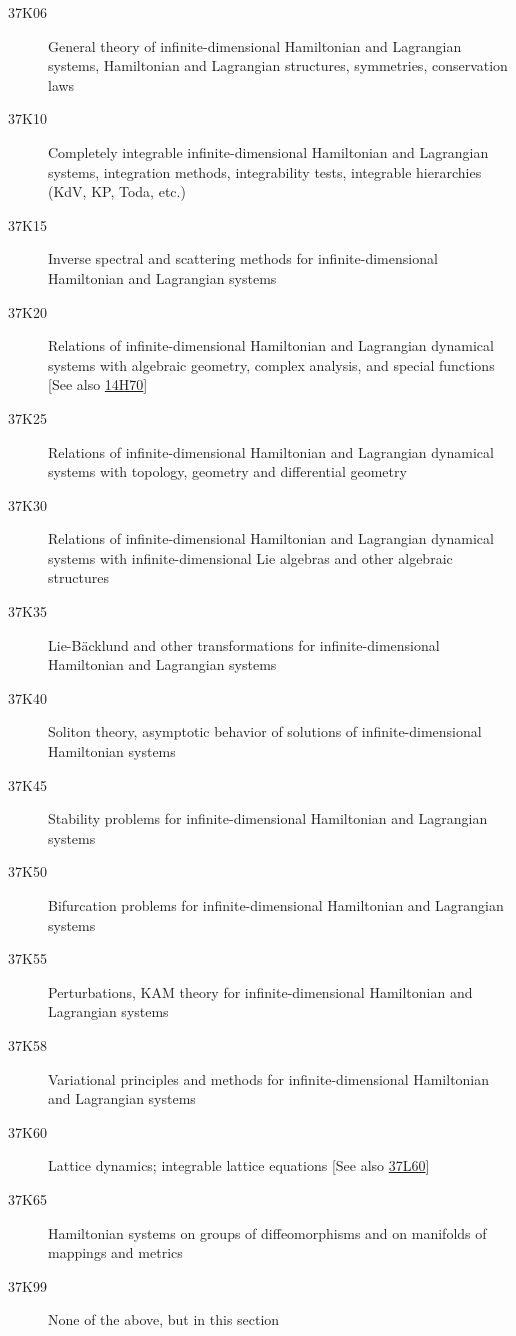 \begin{description} 
\item [37K06]\label{37K06} General theory of infinite-dimensional Hamiltonian and Lagrangian systems, Hamiltonian and Lagrangian structures, symmetries,  conservation laws
\item [37K10]\label{37K10} Completely integrable infinite-dimensional Hamiltonian and Lagrangian systems, integration methods, integrability tests, integrable hierarchies (KdV, KP, Toda, etc.)
\item [37K15]\label{37K15} Inverse spectral and scattering methods for infinite-dimensional Hamiltonian and Lagrangian systems
\item [37K20]\label{37K20}  Relations of infinite-dimensional Hamiltonian and Lagrangian dynamical systems with algebraic geometry, complex analysis, and special functions [See also \hyperref[14H70]{14H70}]
\item [37K25]\label{37K25} Relations of infinite-dimensional Hamiltonian and Lagrangian dynamical systems with topology, geometry and differential geometry
\item [37K30]\label{37K30} Relations of infinite-dimensional Hamiltonian and Lagrangian dynamical systems with infinite-dimensional Lie algebras and other algebraic structures
\item [37K35]\label{37K35} Lie-B\"{a}cklund and other transformations for infinite-dimensional Hamiltonian and Lagrangian systems
\item [37K40]\label{37K40} Soliton theory, asymptotic behavior of solutions of infinite-dimensional Hamiltonian systems
\item [37K45]\label{37K45} Stability problems for infinite-dimensional Hamiltonian and Lagrangian systems
\item [37K50]\label{37K50} Bifurcation problems for infinite-dimensional Hamiltonian and Lagrangian systems
\item [37K55]\label{37K55} Perturbations, KAM theory for infinite-dimensional Hamiltonian and Lagrangian systems
\item [37K58]\label{37K58} Variational principles and methods  for infinite-dimensional Hamiltonian and Lagrangian systems
\item [37K60]\label{37K60} Lattice dynamics; integrable lattice equations [See also \hyperref[37L60]{37L60}]
\item [37K65]\label{37K65} Hamiltonian systems on groups of diffeomorphisms and on manifolds of mappings and metrics
\item [37K99]\label{37K99} None of the above, but in this section
\end{description}
